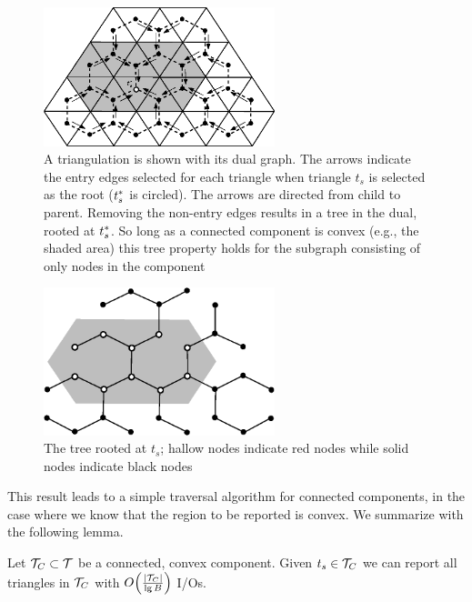 {  \begin{figure}[th]
	  \centering
		  \includegraphics[width=0.6\textwidth]{Fig7}
	  \caption[Dual graph with non-entry edges removed forms a tree]{ 
	    A triangulation is shown with its dual graph. 
	    The arrows indicate the entry edges selected for each triangle when
	    triangle $t_s$ is selected as the root ($t^*_s$ is circled). 
	    The arrows are directed from child to parent.
	    Removing the non-entry edges results in a tree in the dual, rooted at 
	    $t^*_s$.
	    So long as a connected component is convex (e.g., the shaded area) this 
	    tree property holds for the subgraph consisting of only nodes in the
	    component} \label{fig:imp_tree_entry}
  \end{figure}
	  
  \begin{figure}[th]
	  \centering 
	  \includegraphics[width=0.6\textwidth]{Fig8}
	  \caption[Tree rooted at $t_s$]{ The tree rooted at $t_s$; hallow
	  nodes indicate red nodes while solid nodes indicate black nodes} \label{fig:implicit_tree}
  \end{figure}

  This result leads to a simple traversal algorithm for connected 
  components, in the case where we know that the region to be reported 
  is convex.
  We summarize with the following lemma.

  \begin{lemma}\label{lem:report_convex_component}
  Let $\mathcal{T}_C \subset \mathcal{T}$ be a connected, convex component.
  Given $t_s \in \mathcal{T}_C$ we can report all triangles in $\mathcal{T}_C$ with 
  $O\!\left(\frac{|\mathcal{T}_C|}{\lg{B}}\right)$ I/Os.
  \end{lemma}

}
